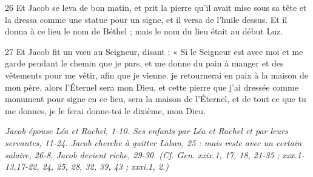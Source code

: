 \par 26 Et Jacob se leva de bon matin, et prit la pierre qu'il avait mise sous sa tête et la dressa comme une statue pour un signe, et il versa de l'huile dessus. Et il donna à ce lieu le nom de Béthel ; mais le nom du lieu était au début Luz.
\par 27 Et Jacob fit un vœu au Seigneur, disant : « Si le Seigneur est avec moi et me garde pendant le chemin que je pars, et me donne du pain à manger et des vêtements pour me vêtir, afin que je vienne. je retournerai en paix à la maison de mon père, alors l'Éternel sera mon Dieu, et cette pierre que j'ai dressée comme monument pour signe en ce lieu, sera la maison de l'Éternel, et de tout ce que tu me donnes, je le ferai donne-toi le dixième, mon Dieu.


\par \textit{Jacob épouse Léa et Rachel, 1-10. Ses enfants par Léa et Rachel et par leurs servantes, 11-24. Jacob cherche à quitter Laban, 25 : mais reste avec un certain salaire, 26-8. Jacob devient riche, 29-30. (Cf. Gen. xxix.1, 17, 18, 21-35 ; xxx.1-13,17-22, 24, 25, 28, 32, 39, 43 ; xxxi.1, 2.)}

